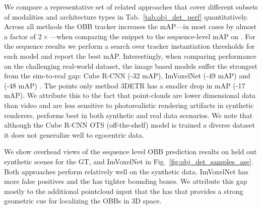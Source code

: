 
We compare a representative set of related approaches that cover different subsets of modalities and architecture types in Tab.~\ref{tab:obj_det_perf} quantitatively.
Across all methods the OBB tracker increases the mAP---in most cases by almost a factor of $2\times$---when comparing the snippet to the sequence-level mAP on \ASE{}.  For the sequence results we perform a search over tracker instantiation thresholds for each model and report the best mAP.
%
Interestingly, when comparing performance on the challenging \AEO{} real-world dataset, the image based models suffer the strongest from the sim-to-real gap: Cube R-CNN (-32 mAP), ImVoxelNet (-49 mAP) and \EFMmodel{} (-48 mAP) . The points only method 3DETR has a smaller drop in mAP (-17 mAP). We attribute this to the fact that point-clouds are lower dimensional data than video and are less sensitive to photorealistic rendering artifacts in synthetic renderers. \EFMmodel{} performs best in both synthetic and real data scenarios.  We note that although the Cube R-CNN OTS (off-the-shelf) model is trained a diverse dataset it does not generalize well to egocentric data.


We show overhead views of the sequence level OBB prediction results on held out synthetic scenes for the GT, \EFMmodel{} and ImVoxelNet in Fig.~\ref{fig:obj_det_samples_ase}. Both approaches perform relatively well on the synthetic data. ImVoxelNet has more false positives and the \EFMmodel{} has tighter bounding boxes. We attribute this gap mostly to the additional pointcloud input that the \EFMmodel{} has that provides a strong geometric cue for localizing the OBBs in 3D space.



